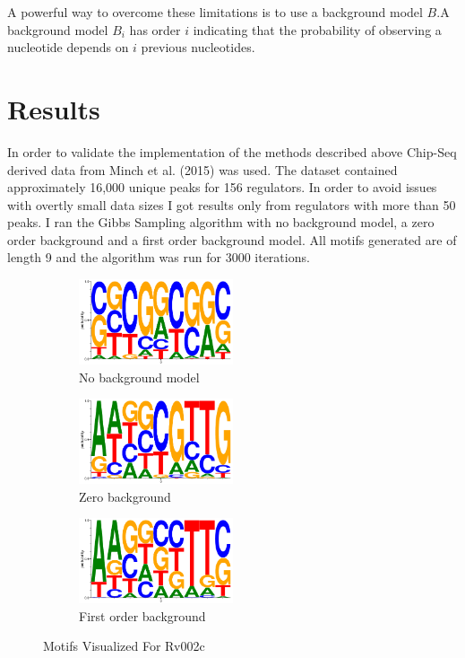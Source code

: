 \documentclass[12pt]{scrartcl} %
\begin{document}
A powerful way to overcome these limitations is to use a background model $B$.A background model 
$B_i$ has order $i$ indicating that the probability of observing a nucleotide depends on $i$ previous
nucleotides.

\section{Results}
In order to validate the implementation of the  methods described above Chip-Seq derived data from Minch et al. (2015) was used. The dataset contained
approximately 16,000 unique peaks for 156 regulators. In order to avoid issues with overtly small data sizes I got results only from regulators with
more than 50 peaks. I ran the Gibbs Sampling algorithm with no background model, a zero order background and a first order background model. All motifs generated
are of length 9 and the algorithm was run for 3000 iterations. 
\begin{figure}[h!]
\centering
    \begin{subfigure}{.4\textwidth}

    \includegraphics[width=0.5\textwidth]{Pictures/rv002c_no_bg.png}
    \caption{No background model}
\end{subfigure}%
    \begin{subfigure}{.4\textwidth}
   
    \includegraphics[width=0.5\textwidth]{Pictures/rv002c_zero_bg.png}
        \caption{Zero background}
\end{subfigure}%
    \begin{subfigure}{.4\textwidth}
    
      \includegraphics[width=0.5\textwidth]{Pictures/rv002c_one_bg.png}
        \caption{First order background}
    \end{subfigure}%
     \caption{Motifs Visualized For Rv002c}
\end{figure}
\end{document}
